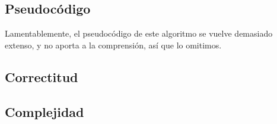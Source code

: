 \documentclass[10pt, a4paper]{article}
\begin{document}

\subsection{Pseudocódigo}

Lamentablemente, el pseudocódigo de este algoritmo se vuelve demasiado extenso, y no aporta a la comprensión, así que lo omitimos.

\subsection{Correctitud}


\subsection{Complejidad}

\end{document}
